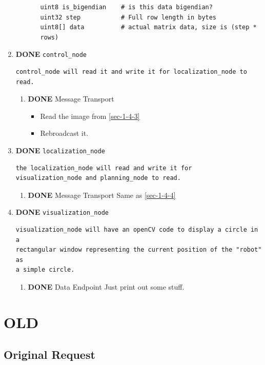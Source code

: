 \documentclass{article}
\begin{document}
\begin{enumerate}
\begin{enumerate}
\begin{enumerate}
\begin{verbatim}
uint8 is_bigendian    # is this data bigendian?
uint32 step           # Full row length in bytes
uint8[] data          # actual matrix data, size is (step * rows)
\end{verbatim}
\end{enumerate}
\end{enumerate}
\item {\bfseries\sffamily DONE} \texttt{control\_node}
\label{sec-1-4-4}
\begin{verbatim}
control_node will read it and write it for localization_node to read.
\end{verbatim}
\begin{enumerate}
\item {\bfseries\sffamily DONE} Message Transport
\label{sec-1-4-4-1}
\begin{itemize}
\item Read the image from \ref{sec-1-4-3}
\item Rebroadcast it.
\end{itemize}
\end{enumerate}
\item {\bfseries\sffamily DONE} \texttt{localization\_node}
\label{sec-1-4-5}
\begin{verbatim}
the localization_node will read and write it for
visualization_node and planning_node to read.
\end{verbatim}
\begin{enumerate}
\item {\bfseries\sffamily DONE} Message Transport
\label{sec-1-4-5-1}
Same as \ref{sec-1-4-4}
\end{enumerate}
\item {\bfseries\sffamily DONE} \texttt{visualization\_node}
\label{sec-1-4-6}
\begin{verbatim}
visualization_node will have an openCV code to display a circle in a
rectangular window representing the current position of the "robot" as
a simple circle.
\end{verbatim}
\begin{enumerate}
\item {\bfseries\sffamily DONE} Data Endpoint
\label{sec-1-4-6-1}
Just print out some stuff.
\end{enumerate}
\end{enumerate}


\section{OLD}
\label{sec-2}
\subsection{Original Request}
\label{sec-2-1}
\end{document}
